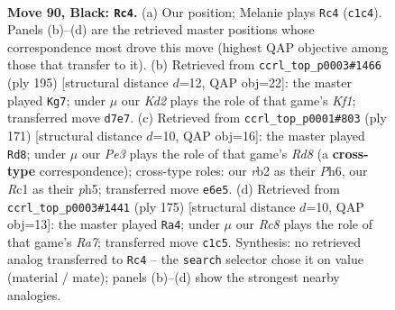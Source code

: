 \documentclass[11pt]{article}
\begin{document}
\clearpage

\begin{figure}[p]\centering
\begin{subfigure}{0.46\textwidth}\centering
\resizebox{\linewidth}{!}{%
\newchessgame
\chessboard[
  setfen={8/3k4/4pp1R/8/P3P3/5PK1/1R6/2r5 b - - 7 90},
  showmover=false,
  pgfstyle=straightmove, color=movearrow, markmove={c1-c4}
]}
\caption{}
\end{subfigure}\hfill
\begin{subfigure}{0.46\textwidth}\centering
\resizebox{\linewidth}{!}{%
\newchessgame
\chessboard[
  setfen={5k2/3R1p2/4p3/4P1P1/5P1K/r7/8/8 b - - 12 98},
  showmover=false,
  pgfstyle=straightmove, color=movearrow, markmove={f8-g7}
]}
\caption{}
\end{subfigure}
\\[4pt]
\begin{subfigure}{0.46\textwidth}\centering
\resizebox{\linewidth}{!}{%
\newchessgame
\chessboard[
  setfen={6k1/2R2p2/5P1p/4P2P/5K2/8/8/3r4 b - - 59 86},
  showmover=false,
  pgfstyle=straightmove, color=movearrow, markmove={d1-d8}
]}
\caption{}
\end{subfigure}\hfill
\begin{subfigure}{0.46\textwidth}\centering
\resizebox{\linewidth}{!}{%
\newchessgame
\chessboard[
  setfen={8/5k2/2R3p1/7p/7P/4KPP1/r7/8 b - - 24 88},
  showmover=false,
  pgfstyle=straightmove, color=movearrow, markmove={a2-a4}
]}
\caption{}
\end{subfigure}
\caption{\textbf{Move 90, Black: \texttt{Rc4}.} (a) Our position; Melanie plays \texttt{Rc4} (\texttt{c1c4}). Panels (b)--(d) are the retrieved master positions whose correspondence most drove this move (highest QAP objective among those that transfer to it). (b) Retrieved from \texttt{ccrl\_top\_p0003\#1466} (ply 195) [structural distance $d$=12, QAP obj=22]: the master played \texttt{Kg7}; under $\mu$ our \emph{Kd2} plays the role of that game's \emph{Kf1}; transferred move \texttt{d7e7}. (c) Retrieved from \texttt{ccrl\_top\_p0001\#803} (ply 171) [structural distance $d$=10, QAP obj=16]: the master played \texttt{Rd8}; under $\mu$ our \emph{Pe3} plays the role of that game's \emph{Rd8} (a \textbf{cross-type} correspondence); cross-type roles: our \emph{r}b2 as their \emph{P}h6, our \emph{R}c1 as their \emph{p}h5; transferred move \texttt{e6e5}. (d) Retrieved from \texttt{ccrl\_top\_p0003\#1441} (ply 175) [structural distance $d$=10, QAP obj=13]: the master played \texttt{Ra4}; under $\mu$ our \emph{Rc8} plays the role of that game's \emph{Ra7}; transferred move \texttt{c1c5}. Synthesis: no retrieved analog transferred to \texttt{Rc4} -- the \texttt{search} selector chose it on value (material / mate); panels (b)--(d) show the strongest nearby analogies.}
\label{fig:thought-m179}
\end{figure}
\end{document}
